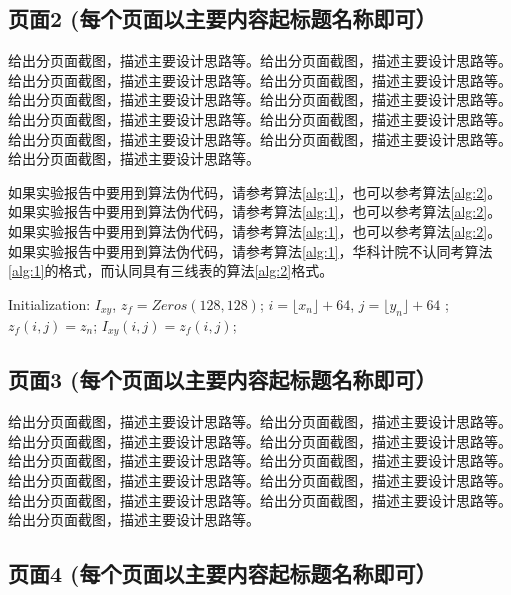 \documentclass[supercite]{Experimental_Report}
\theoremstyle{definition}
\begin{document}
\subsection{页面2 (每个页面以主要内容起标题名称即可）}

给出分页面截图，描述主要设计思路等。给出分页面截图，描述主要设计思路等。给出分页面截图，描述主要设计思路等。给出分页面截图，描述主要设计思路等。给出分页面截图，描述主要设计思路等。给出分页面截图，描述主要设计思路等。给出分页面截图，描述主要设计思路等。给出分页面截图，描述主要设计思路等。给出分页面截图，描述主要设计思路等。给出分页面截图，描述主要设计思路等。给出分页面截图，描述主要设计思路等。


如果实验报告中要用到算法伪代码，请参考算法\ref{alg:1}，也可以参考算法\ref{alg:2}。如果实验报告中要用到算法伪代码，请参考算法\ref{alg:1}，也可以参考算法\ref{alg:2}。如果实验报告中要用到算法伪代码，请参考算法\ref{alg:1}，也可以参考算法\ref{alg:2}。如果实验报告中要用到算法伪代码，请参考算法\ref{alg:1}，华科计院不认同考算法\ref{alg:1}的格式，而认同具有三线表的算法\ref{alg:2}格式。

\begin{algorithm}[h] 
	\caption{一个更复杂算法}
	\begin{algorithmic}[1]
		\State Initialization: $I_{xy}$, $z_{f}=Zeros(128, 128)$; 
		\State $i=\lfloor x_n \rfloor+64$, $j=\lfloor y_n \rfloor + 64$
		;
		\State $z_{f}(i,j)=z_n$;
		\EndIf
		\State $I_{xy}(i,j)=z_{f}(i,j)$;
		\EndFor 
	\end{algorithmic}\label{alg:2}
\end{algorithm}

\subsection{页面3 (每个页面以主要内容起标题名称即可）}

给出分页面截图，描述主要设计思路等。给出分页面截图，描述主要设计思路等。给出分页面截图，描述主要设计思路等。给出分页面截图，描述主要设计思路等。给出分页面截图，描述主要设计思路等。给出分页面截图，描述主要设计思路等。给出分页面截图，描述主要设计思路等。给出分页面截图，描述主要设计思路等。给出分页面截图，描述主要设计思路等。给出分页面截图，描述主要设计思路等。给出分页面截图，描述主要设计思路等。

\subsection{页面4 (每个页面以主要内容起标题名称即可）}
\end{document}
